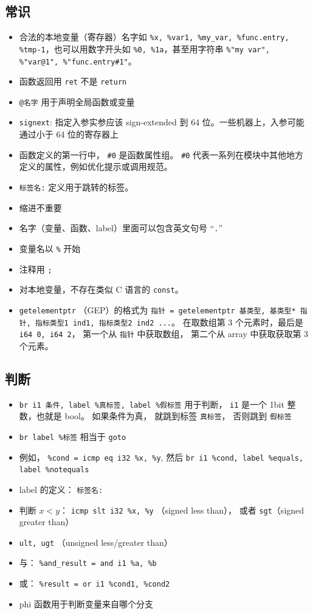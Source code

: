 \subsection{常识}
\begin{itemize}
\item 合法的本地变量（寄存器）名字如 \verb`%x, %var1, %my_var, %func.entry, %tmp-1`，也可以用数字开头如 \verb`%0, %1a`，甚至用字符串 \verb`%"my var", %"var@1", %"func.entry#1"`。
\item 函数返回用 \verb`ret` 不是 \verb`return`
\item \verb`@名字` 用于声明全局函数或变量
\item \verb`signext`: 指定入参实参应该 sign-extended 到 64 位。一些机器上，入参可能通过小于 64 位的寄存器上
\item 函数定义的第一行中， \verb`#0` 是函数属性组。 \verb`#0` 代表一系列在模块中其他地方定义的属性，例如优化提示或调用规范。
\item \verb`标签名:` 定义用于跳转的标签。
\item 缩进不重要
\item 名字（变量、函数、label）里面可以包含英文句号 “\verb`.`”
\item 变量名以 \verb`%` 开始
\item 注释用 \verb`;`
\item 对本地变量，不存在类似 C 语言的 \verb`const`。
\item \verb`getelementptr` （GEP）的格式为 \verb`指针 = getelementptr 基类型, 基类型* 指针, 指标类型1 ind1, 指标类型2 ind2 ...`。 在取数组第 3 个元素时，最后是 \verb`i64 0, i64 2`， 第一个从 \verb`指针` 中获取数组， 第二个从 array 中获取获取第 3 个元素。
\end{itemize}

\subsection{判断}
\begin{itemize}
\item \verb`br i1 条件, label %真标签, label %假标签` 用于判断， \verb`i1` 是一个 1bit 整数，也就是 bool。 如果条件为真， 就跳到标签 \verb`真标签`， 否则跳到 \verb`假标签`
\item \verb`br label %标签` 相当于 \verb`goto`
\item 例如， \verb`%cond = icmp eq i32 %x, %y`, 然后 \verb`br i1 %cond, label %equals, label %notequals`
\item label 的定义： \verb`标签名:`
\item 判断 $x < y$： \verb`icmp slt i32 %x, %y` （signed less than）， 或者 \verb`sgt`（signed greater than）
\item \verb`ult, ugt` （unsigned less/greater than）
\item 与： \verb`%and_result = and i1 %a, %b`
\item 或： \verb`%result = or i1 %cond1, %cond2`
\item phi 函数用于判断变量来自哪个分支
\end{itemize}

